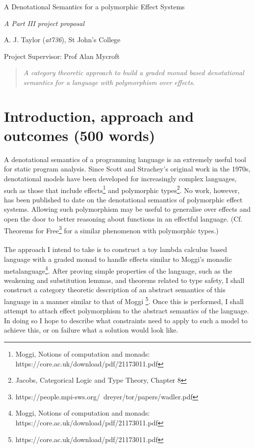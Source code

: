 \documentclass[11pt]{article}
\begin{document}
\centerline{\Large A Denotational Semantics for a polymorphic Effect Systems}
\vspace{2em}
\centerline{\Large \emph{A Part III project proposal}}
\vspace{2em}
\centerline{\large A. J. Taylor (\emph{at736}), St John's College}
\vspace{1em}
\centerline{\large Project Supervisor: Prof Alan Mycroft}
\vspace{1em}

\begin{abstract}
\textsl{
	A category theoretic approach to build a graded monad based denotational semantics for a language with polymorphism over effects.
} 
\end{abstract}

\section{Introduction, approach and outcomes (500 words)}
  
\paragraph{}{
A denotational semantics of a programming language is an extremely useful tool for static program analysis. Since Scott and Strachey's original work in the 1970s, denotational models have been developed for increasingly complex languages, such as those that include effects\footnote{Moggi, Notions of computation and monads: https://core.ac.uk/download/pdf/21173011.pdf} and polymorphic types\footnote{ Jacobs, Categorical Logic and Type Theory, Chapter 8}. No work, however, has been published to date on the denotational semantics of polymorphic effect systems. Allowing such polymorphism may be useful to generalise over effects and open the door to better reasoning about functions in an effectful language. (Cf. Theorems for Free\footnote{https://people.mpi-sws.org/~dreyer/tor/papers/wadler.pdf} for a similar phenomenon with polymorphic types.)
}




\paragraph{}{
The approach I intend to take is to construct a toy lambda calculus based language with a graded monad to handle effects similar to Moggi's monadic metalanguage\footnote{Moggi, Notions of computation and monads: https://core.ac.uk/download/pdf/21173011.pdf}. After proving simple properties of the language, such as the weakening and substitution lemmas, and theorems related to type safety, I shall construct a category theoretic description of an abstract semantics of this language in a manner similar to that of Moggi \footnote{https://core.ac.uk/download/pdf/21173011.pdf}. Once this is performed, I shall attempt to attach effect polymorphism to the abstract semantics of the language. In doing so I hope to describe what constraints need to apply to such a model to achieve this, or on failure what a solution would look like.}
\end{document}

